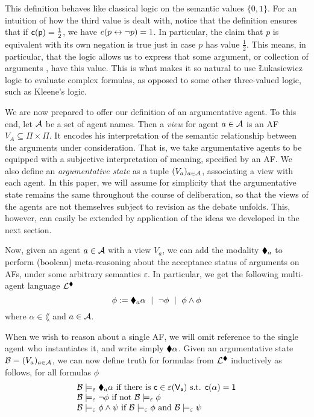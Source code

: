 \documentclass[greybox]{svmult}
\newcommand{\clab}{\sf c}
\newcommand{\views}{\mathcal B}
\newcommand{\sem}{\varepsilon}
\begin{document}
This definition behaves like classical logic on the semantic values $\{0,1\}$. For an intuition of how the third value is dealt with, notice that the definition ensures that if $\clab(p) = \frac{1}{2}$, we have $\overline \clab(p \leftrightarrow \neg p) = 1$. In particular, the claim that $p$ is equivalent with its own negation is true just in case $p$ has value $\frac{1}{2}$. This means, in particular, that the logic allows us to express that some argument, or collection of arguments , have this value. This is what makes it so natural to use {\L}ukasiewicz logic to evaluate complex formulas, as opposed to some other three-valued logic, such as Kleene's logic. 

We are now prepared to offer our definition of an argumentative agent. To this end, let $\mathcal A$ be a set of agent names. Then a \emph{view} for agent $a \in \mathcal A$ is an AF $V_A \subseteq \Pi \times \Pi$. It encodes his interpretation of the semantic relationship between the arguments under consideration. That is, we take argumentative agents to be equipped with a subjective interpretation of meaning, specified by an AF. We also define an \emph{argumentative state} as a tuple $(V_a)_{a \in \mathcal A}$, associating a view with each agent. In this paper, we will assume for simplicity that the argumentative state remains the same throughout the course of deliberation, so that the views of the agents are not themselves subject to revision as the debate unfolds. This, however, can easily be extended by application of the ideas we developed in the next section.

Now, given an agent $a \in \mathcal A$ with a view $V_a$, we can add the modality $\blacklozenge_a$ to perform (boolean) meta-reasoning about the acceptance status of arguments on AFs, under some arbitrary semantics $\sem$. In particular, we get the following multi-agent language $\mathcal L^{\blacklozenge}$
$$
\phi := \blacklozenge_a \alpha \ \mid \ \neg \phi \ \mid \ \phi \land \phi $$ where $\alpha \in \lang$ and $a \in \mathcal A$. 

When we wish to reason about a single AF, we will omit reference to the single agent who instantiates it, and write simply $\blacklozenge \alpha$. Given an argumentative state $\views = (V_a)_{a\in \agents}$, we can now define truth for formulas from $\mathcal L^{\blacklozenge}$ inductively as follows, for all formulas $\phi$
\begin{equation}\label{eq:asem}
\begin{array}{l}
\views \models_\sem \cdia_a \alpha \text{ if there is } \clab \in \sem(V_a) \text{ s.t. } \overline \clab(\alpha) = 1 \\
\views \models_\sem \neg \phi \text{ if not } \views \models_\sem \phi \\
\views \models_\sem \phi \land \psi \text{ if } \views \models_\sem \phi \text{ and } \views \models_\sem \psi 
\end{array}
\end{equation}
\end{document}
